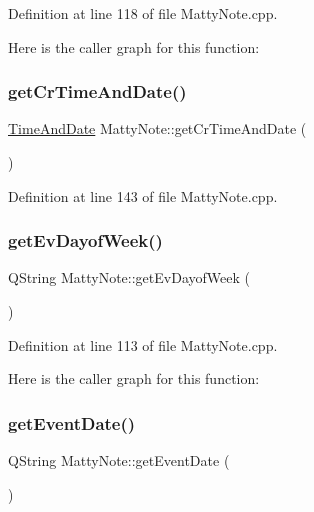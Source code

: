 Definition at line 118 of file Matty\+Note.\+cpp.

Here is the caller graph for this function\+:
\hypertarget{classMattyNote_aff50eb125d7a0a64ac3fb21f056ec745}{}\label{classMattyNote_aff50eb125d7a0a64ac3fb21f056ec745} 
\subsubsection{\texorpdfstring{get\+Cr\+Time\+And\+Date()}{getCrTimeAndDate()}}
{\footnotesize\ttfamily \hyperlink{structTimeAndDate}{Time\+And\+Date} Matty\+Note\+::get\+Cr\+Time\+And\+Date (\begin{DoxyParamCaption}{ }\end{DoxyParamCaption})}



Definition at line 143 of file Matty\+Note.\+cpp.

\hypertarget{classMattyNote_ac6f675c525f027536fdcfda43f0a261e}{}\label{classMattyNote_ac6f675c525f027536fdcfda43f0a261e} 
\subsubsection{\texorpdfstring{get\+Ev\+Dayof\+Week()}{getEvDayofWeek()}}
{\footnotesize\ttfamily Q\+String Matty\+Note\+::get\+Ev\+Dayof\+Week (\begin{DoxyParamCaption}{ }\end{DoxyParamCaption})}



Definition at line 113 of file Matty\+Note.\+cpp.

Here is the caller graph for this function\+:
\hypertarget{classMattyNote_a8973578029ab29593061cca235ae84f9}{}\label{classMattyNote_a8973578029ab29593061cca235ae84f9} 
\subsubsection{\texorpdfstring{get\+Event\+Date()}{getEventDate()}}
{\footnotesize\ttfamily Q\+String Matty\+Note\+::get\+Event\+Date (\begin{DoxyParamCaption}{ }\end{DoxyParamCaption})}



